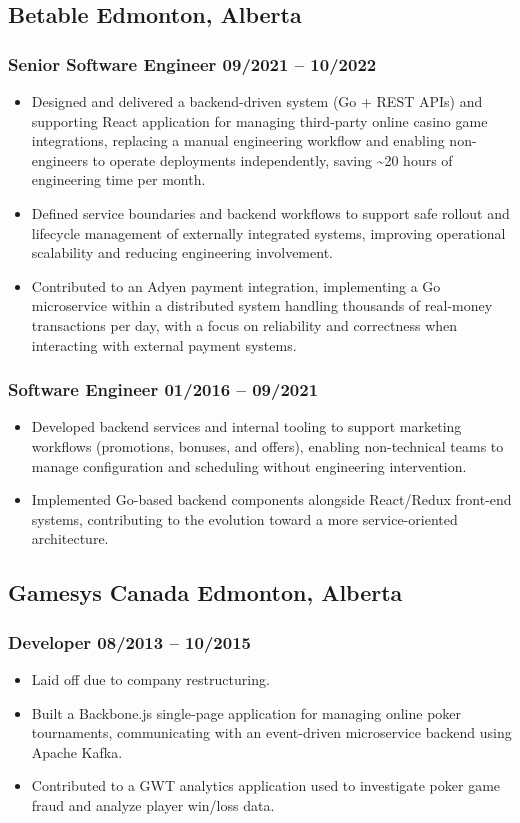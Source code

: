 \documentclass[10pt]{article}
\begin{document}
\subsection{Betable \hfill Edmonton, Alberta}
\subsubsection{Senior Software Engineer \hfill 09/2021 -- 10/2022}
\begin{itemize}
  \item Designed and delivered a backend-driven system (Go + REST APIs) and supporting React application for managing third-party online casino game integrations, replacing a manual engineering workflow and enabling non-engineers to operate deployments independently, saving \textasciitilde20 hours of engineering time per month.
  \item Defined service boundaries and backend workflows to support safe rollout and lifecycle management of externally integrated systems, improving operational scalability and reducing engineering involvement.
  \item Contributed to an Adyen payment integration, implementing a Go microservice within a distributed system handling thousands of real-money transactions per day, with a focus on reliability and correctness when interacting with external payment systems.
\end{itemize}

\subsubsection{Software Engineer \hfill 01/2016 -- 09/2021}
\begin{itemize}
  \item Developed backend services and internal tooling to support marketing workflows (promotions, bonuses, and offers), enabling non-technical teams to manage configuration and scheduling without engineering intervention.
  \item Implemented Go-based backend components alongside React/Redux front-end systems, contributing to the evolution toward a more service-oriented architecture.
\end{itemize}

\subsection{Gamesys Canada \hfill Edmonton, Alberta}
\subsubsection{Developer \hfill 08/2013 -- 10/2015}
\begin{itemize}
  \item Laid off due to company restructuring.
  \item Built a Backbone.js single-page application for managing online poker tournaments, communicating with an event-driven microservice backend using Apache Kafka.
  \item Contributed to a GWT analytics application used to investigate poker game fraud and analyze player win/loss data.
\end{itemize}
\end{document}
